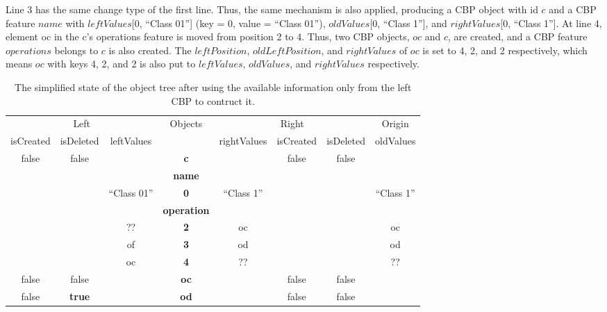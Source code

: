 \documentclass{llncs}
\begin{document}
Line 3 has the same change type of the first line. Thus, the same mechanism is also applied, producing a CBP object with id $c$ and a CBP feature $name$ with $leftValues$[0, ``Class 01''] (key = 0, value = ``Class 01''), $oldValues$[0, ``Class 1''], and $rightValues$[0, ``Class 1'']. At line 4, element \textsf{oc} in the \textsf{c}'s \textsf{operations} feature is moved from position 2 to 4. Thus, two CBP objects, $oc$ and $c$, are created, and a CBP feature $operations$ belongs to $c$ is also created. The $leftPosition$, $oldLeftPosition$, and $rightValues$ of $oc$ is set to 4, 2, and 2 respectively, which means $oc$ with  keys 4, 2, and 2 is also put to $leftValues$, $oldValues$, and $rightValues$ respectively. 

\begin{table}
    \centering
    \begin{footnotesize}
        \caption{The simplified state of the object tree after using the available information only from the left CBP to contruct it.}
        \label{table:left_object_tree}
        \begin{tabular}{  c  c  c  c  c  c  c  c  }
            \hline
            \multicolumn{3}{c}{Left} & \multirow{2}{*}{Objects} & \multicolumn{3}{c}{Right} & Origin\\
            \hhline{---~----}
            isCreated & isDeleted & leftValues & & rightValues & isCreated & isDeleted & oldValues\\
            \hline
            \rowcolor{gray1}
            false & false & & \textbf{\textsf{c}} & & false & false & \\
            \rowcolor{gray2}
            & & & \textbf{\textsf{name}} & & & & \\
            & & ``Class 01'' & \textbf{0} & ``Class 1'' & & & ``Class 1'' \\
            \rowcolor{gray2}
            & & & \textbf{\textsf{operation}} & & & & \\
            & & ?? & \textbf{\small{2}} & oc & & & oc \\
            & & of & \textbf{\small{3}} & od & & & od \\
            & & oc & \textbf{\small{4}} & ?? & & & ?? \\
            \hline
            \rowcolor{gray1}
            false & false & & \textbf{\textsf{oc}} & & false & false & \\
            \hline
            \rowcolor{gray1}
            false & \textbf{true} & & \textbf{\textsf{od}} & & false & false & \\

\end{tabular}
\end{footnotesize}
\end{table}
\end{document}
